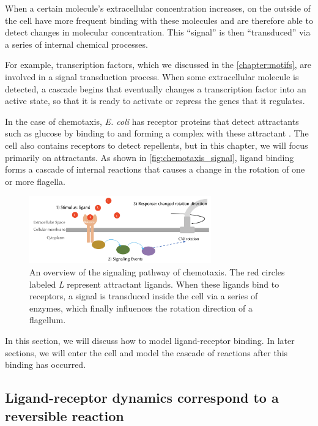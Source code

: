 When a certain molecule's extracellular concentration increases,  on the outside of the cell have more frequent binding with these molecules and are therefore able to detect changes in molecular concentration. This ``signal'' is then ``transduced'' via a series of internal chemical processes.

For example, transcription factors, which we discussed in the \autoref{chapter:motifs}, are involved in a signal transduction process. When some extracellular molecule is detected, a cascade begins that eventually changes a transcription factor into an active state, so that it is ready to activate or repress the genes that it regulates.

In the case of chemotaxis, \textit{E. coli} has receptor proteins that detect attractants such as glucose by binding to and forming a complex with these attractant . The cell also contains receptors to detect repellents, but in this chapter, we will focus primarily on attractants. As shown in \autoref{fig:chemotaxis_signal}, ligand binding forms a cascade of internal reactions that causes a change in the rotation of one or more flagella.

\begin{figure}[h]
\centering
\mySfFamily
\includegraphics[width = 0.7\textwidth]{../images/chemotaxis_signal.png}
\caption{An overview of the signaling pathway of chemotaxis. The red circles labeled \textit{L} represent attractant ligands. When these ligands bind to receptors, a signal is transduced inside the cell via a series of enzymes, which finally influences the rotation direction of a flagellum.}
\label{fig:chemotaxis_signal}
\end{figure}

In this section, we will discuss how to model ligand-receptor binding. In later sections, we will enter the cell and model the cascade of reactions after this binding has occurred.

\FloatBarrier
{}
\subsection{Ligand-receptor dynamics correspond to a reversible reaction}

